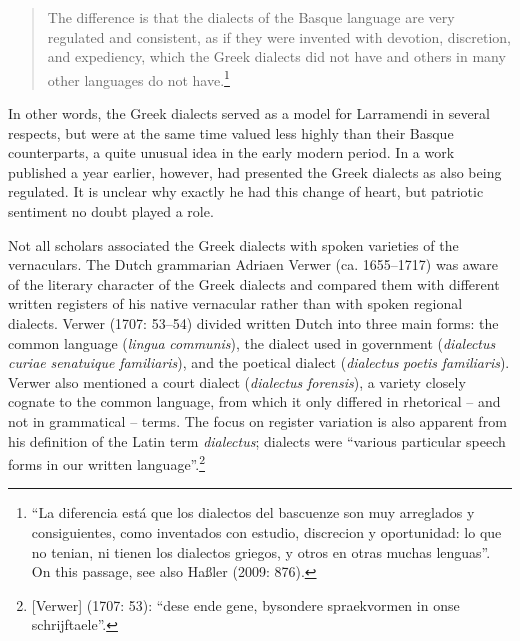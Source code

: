 \documentclass[output=paper]{langsci/langscibook}
\begin{document}
\begin{quote}
The difference is that the dialects of the Basque language are very regulated and consistent, as if they were invented with devotion, discretion, and expediency, which the Greek dialects did not have and others in many other languages do not have.\footnote{“La diferencia está que los dialectos del bascuenze son muy arreglados y consiguientes, como inventados con estudio, discrecion y oportunidad: lo que no tenian, ni tienen los dialectos griegos, y otros en otras muchas lenguas”. On this passage, see also Haßler (2009: 876).}
\end{quote}

In other words, the Greek dialects served as a model for Larramendi in several respects, but were at the same time valued less highly than their Basque counterparts, a quite unusual idea in the early modern period. In a work published a year earlier, however, \citet[142]{Larramendi1728} had presented the Greek dialects as also being regulated. It is unclear why exactly he had this change of heart, but patriotic sentiment no doubt played a role.

Not all scholars associated the Greek dialects with spoken varieties of the vernaculars. The Dutch grammarian Adriaen Verwer (ca. 1655–1717) was aware of the literary character of the Greek dialects and compared them with different written registers of his native vernacular rather than with spoken regional dialects. Verwer (1707: 53–54) divided written Dutch into three main forms:  the common language (\textit{lingua} \textit{communis}),  the dialect used in government (\textit{dialectus} \textit{curiae} \textit{senatuique} \textit{familiaris}), and  the poetical dialect (\textit{dialectus} \textit{poetis} \textit{familiaris}). Verwer also mentioned a court dialect (\textit{dialectus} \textit{forensis}), a variety closely cognate to the common language, from which it only differed in rhetorical – and not in grammatical – terms. The focus on register variation is also apparent from his definition of the Latin term \textit{dialectus}; dialects were “various particular speech forms in our written language”.\footnote{[Verwer] (1707: 53): “dese ende gene, bysondere spraekvormen in onse schrijftaele”.}
\end{document}
